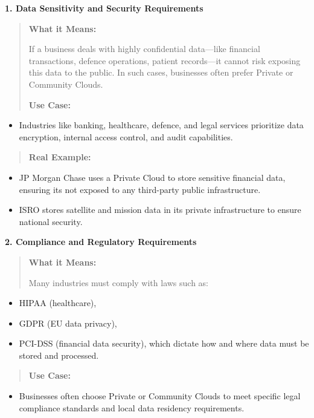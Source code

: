 \documentclass[12pt]{article}
\begin{document}
\textbf{1. Data Sensitivity and Security Requirements}

\begin{quote}
\textbf{What it Means:}

If a business deals with highly confidential data---like financial
transactions, defence operations, patient records---it cannot risk
exposing this data to the public. In such cases, businesses often prefer
Private or Community Clouds.

\textbf{Use Case:}
\end{quote}

\begin{itemize}
\item
  Industries like banking, healthcare, defence, and legal services
  prioritize data encryption, internal access control, and audit
  capabilities.
\end{itemize}

\begin{quote}
\textbf{Real Example:}
\end{quote}

\begin{itemize}
\item
  JP Morgan Chase uses a Private Cloud to store sensitive financial
  data, ensuring it\textquotesingle s not exposed to any third-party
  public infrastructure.
\item
  ISRO stores satellite and mission data in its private infrastructure
  to ensure national security.
\end{itemize}

\textbf{2. Compliance and Regulatory Requirements}

\begin{quote}
\textbf{What it Means:}

Many industries must comply with laws such as:
\end{quote}

\begin{itemize}
\item
  HIPAA (healthcare),
\item
  GDPR (EU data privacy),
\item
  PCI-DSS (financial data security), which dictate how and where data
  must be stored and processed.
\end{itemize}

\begin{quote}
\textbf{Use Case:}
\end{quote}

\begin{itemize}
\item
  Businesses often choose Private or Community Clouds to meet specific
  legal compliance standards and local data residency requirements.
\end{itemize}
\end{document}
